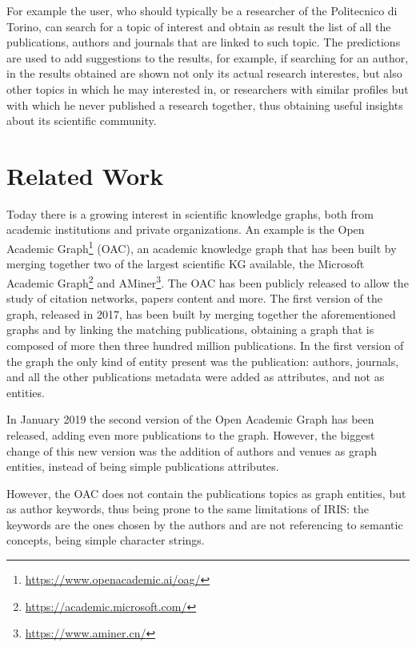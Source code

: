 \documentclass[%
    corpo=13.5pt,
    twoside,
    oldstyle,
    tipotesi=magistrale,
    greek,
    evenboxes
]{toptesi}
\begin{document}
For example the user, who should typically be a researcher of the Politecnico di
Torino, can search for a topic of interest and obtain as result the list of all
the publications, authors and journals that are linked to such topic.
The predictions are used to add suggestions to the results, for example,
if searching for an author, in the results obtained are shown not only its
actual research interestes, but also other topics in which he may interested in,
or researchers with similar profiles but with which he never published a
research together, thus obtaining useful insights about its scientific community.




\chapter{Related Work}

Today there is a growing interest in scientific
knowledge graphs, both from academic institutions and private organizations.
An example is the Open Academic
Graph\footnote{\url{https://www.openacademic.ai/oag/}} (OAC), an academic
knowledge graph that has been built by merging together two of the largest
scientific KG available, the Microsoft Academic
Graph\footnote{\url{https://academic.microsoft.com/}}
and AMiner\footnote{\url{https://www.aminer.cn/}}.
The OAC has been publicly released to allow
the study of citation networks, papers content and more.
The first version of the graph, released in 2017, has been
built by merging together the aforementioned graphs and by linking the
matching publications, obtaining a graph that is composed of more then three
hundred million publications. In the first version of the graph the only kind of
entity present was the publication: authors, journals, and all
the other publications metadata were added as attributes, and not as entities.

In January 2019 the second version of the Open Academic Graph has been
released, adding even more publications to the graph.
However, the biggest change of this new
version was the addition of authors and venues as graph entities,
instead of being simple publications attributes.

However, the OAC does not contain the publications topics as graph
entities, but as author keywords, thus being prone to the same limitations of
IRIS: the keywords are the ones chosen by the authors and are not
referencing to semantic concepts, being simple character strings.
\newline
\end{document}

